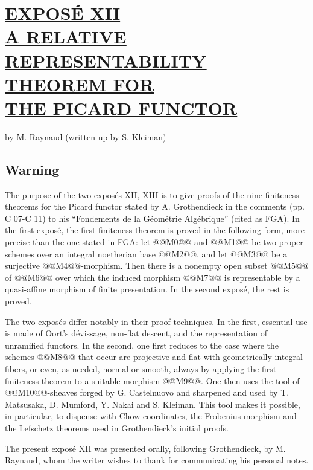 \section*{\underline{EXPOSÉ XII}\\[3pt] \underline{\underline{A RELATIVE REPRESENTABILITY THEOREM FOR}}\\[3pt] \underline{\underline{THE PICARD FUNCTOR}}}
\begin{center}
\underline{by M. Raynaud (written up by S. Kleiman)}
\end{center}

\subsection*{Warning}

The purpose of the two exposés XII, XIII is to give proofs of the nine finiteness theorems for the Picard functor stated by A. Grothendieck in the comments (pp. C 07-C 11) to his ``Fondements de la Géométrie Algébrique'' (cited as FGA). In the first exposé, the first finiteness theorem is proved in the following form, more precise than the one stated in FGA: let @@M0@@ and @@M1@@ be two proper schemes over an integral noetherian base @@M2@@, and let @@M3@@ be a surjective @@M4@@-morphism. Then there is a nonempty open subset @@M5@@ of @@M6@@ over which the induced morphism @@M7@@ is representable by a quasi-affine morphism of finite presentation. In the second exposé, the rest is proved.

The two exposés differ notably in their proof techniques. In the first, essential use is made of Oort's dévissage, non-flat descent, and the representation of unramified functors. In the second, one first reduces to the case where the schemes @@M8@@ that occur are projective and flat with geometrically integral fibers, or even, as needed, normal or smooth, always by applying the first finiteness theorem to a suitable morphism @@M9@@. One then uses the tool of @@M10@@-sheaves forged by G. Castelnuovo and sharpened and used by T. Matsusaka, D. Mumford, Y. Nakai and S. Kleiman. This tool makes it possible, in particular, to dispense with Chow coordinates, the Frobenius morphism and the Lefschetz theorems used in Grothendieck's initial proofs.

The present exposé XII was presented orally, following Grothendieck, by M. Raynaud, whom the writer wishes to thank for communicating his personal notes.

